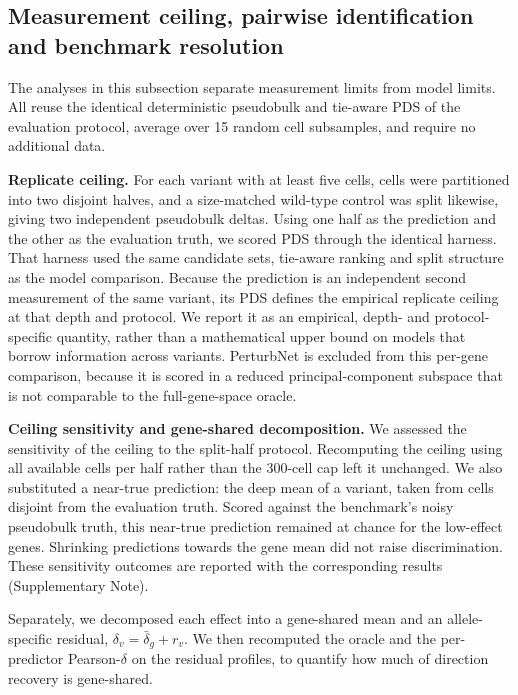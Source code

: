 \documentclass[11pt,letterpaper]{article}
\begin{document}
\subsection*{Measurement ceiling, pairwise identification and benchmark resolution}

The analyses in this subsection separate measurement limits from model limits. All reuse the identical deterministic pseudobulk and tie-aware PDS of the evaluation protocol, average over 15 random cell subsamples, and require no additional data.

\textbf{Replicate ceiling.} For each variant with at least five cells, cells were partitioned into two disjoint halves, and a size-matched wild-type control was split likewise, giving two independent pseudobulk deltas. Using one half as the prediction and the other as the evaluation truth, we scored PDS through the identical harness. That harness used the same candidate sets, tie-aware ranking and split structure as the model comparison. Because the prediction is an independent second measurement of the same variant, its PDS defines the empirical replicate ceiling at that depth and protocol. We report it as an empirical, depth- and protocol-specific quantity, rather than a mathematical upper bound on models that borrow information across variants. PerturbNet is excluded from this per-gene comparison, because it is scored in a reduced principal-component subspace that is not comparable to the full-gene-space oracle.

\textbf{Ceiling sensitivity and gene-shared decomposition.} We assessed the sensitivity of the ceiling to the split-half protocol. Recomputing the ceiling using all available cells per half rather than the 300-cell cap left it unchanged. We also substituted a near-true prediction: the deep mean of a variant, taken from cells disjoint from the evaluation truth. Scored against the benchmark's noisy pseudobulk truth, this near-true prediction remained at chance for the low-effect genes. Shrinking predictions towards the gene mean did not raise discrimination. These sensitivity outcomes are reported with the corresponding results (Supplementary Note).

Separately, we decomposed each effect into a gene-shared mean and an allele-specific residual, $\delta_v = \bar{\delta}_g + r_v$. We then recomputed the oracle and the per-predictor Pearson-$\delta$ on the residual profiles, to quantify how much of direction recovery is gene-shared.
\end{document}
